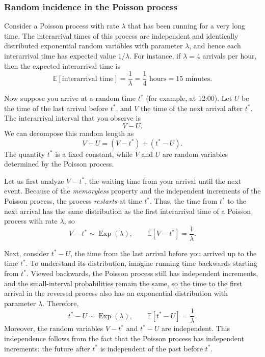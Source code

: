 \subsubsection{Random incidence in the Poisson process}

Consider a Poisson process with rate \(\lambda\) that has been running for a very long time.  
The interarrival times of this process are independent and identically distributed exponential random variables with parameter \(\lambda\), and hence each interarrival time has expected value \(1/\lambda\).  
For instance, if \(\lambda = 4\) arrivals per hour, then the expected interarrival time is
\[
\mathbb{E}[\text{interarrival time}] = \frac{1}{\lambda} = \frac{1}{4} \text{ hours} = 15 \text{ minutes}.
\]

Now suppose you arrive at a random time \(t^{\ast}\) (for example, at 12:00).  
Let \(U\) be the time of the last arrival before \(t^{\ast}\), and \(V\) the time of the next arrival after \(t^{\ast}\).  
The interarrival interval that you observe is
\[
V - U.
\]
We can decompose this random length as
\[
V - U = (V - t^{\ast}) + (t^{\ast} - U).
\]
The quantity \(t^{\ast}\) is a fixed constant, while \(V\) and \(U\) are random variables determined by the Poisson process.  

Let us first analyze \(V - t^{\ast}\), the waiting time from your arrival until the next event.  
Because of the \textit{memoryless} property and the independent increments of the Poisson process, the process \textit{restarts} at time \(t^{\ast}\).  
Thus, the time from \(t^{\ast}\) to the next arrival has the same distribution as the first interarrival time of a Poisson process with rate \(\lambda\), so
\[
V - t^{\ast} \sim \operatorname{Exp}(\lambda),
\qquad
\mathbb{E}[V - t^{\ast}] = \frac{1}{\lambda}.
\]

Next, consider \(t^{\ast} - U\), the time from the last arrival before you arrived up to the time \(t^{\ast}\).  
To understand its distribution, imagine running time backwards starting from \(t^{\ast}\).  
Viewed backwards, the Poisson process still has independent increments, and the small-interval probabilities remain the same, so the time to the first arrival in the reversed process also has an exponential distribution with parameter \(\lambda\).  
Therefore,
\[
t^{\ast} - U \sim \operatorname{Exp}(\lambda),
\qquad
\mathbb{E}[t^{\ast} - U] = \frac{1}{\lambda}.
\]
Moreover, the random variables \(V - t^{\ast}\) and \(t^{\ast} - U\) are independent.  
This independence follows from the fact that the Poisson process has independent increments: the future after \(t^{\ast}\) is independent of the past before \(t^{\ast}\).  

